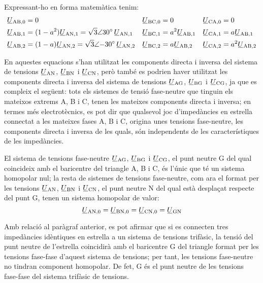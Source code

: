 Expressant-ho en forma matemàtica tenim:
\begin{subequations}
\begin{align}
   \cmplx{U}\ped{AB,0} &= 0 &
   \cmplx{U}\ped{BC,0} &= 0 &
   \cmplx{U}\ped{CA,0} &= 0 \\
   \cmplx{U}\ped{AB,1} &= (1-a^2) \cmplx{U}\ped{AN,1} =
   \complexnum[parse-numbers=false]{\sqrt{3}:30} \,\cmplx{U}\ped{AN,1} &
   \cmplx{U}\ped{BC,1} &= a^2 \cmplx{U}\ped{AB,1} &
   \cmplx{U}\ped{CA,1} &= a \cmplx{U}\ped{AB,1} \label{eq:c_sim_a3} \\
   \cmplx{U}\ped{AB,2} &= (1-a) \cmplx{U}\ped{AN,2}  =
   \complexnum[parse-numbers=false]{\sqrt{3}:-30} \,\cmplx{U}\ped{AN,2} &
   \cmplx{U}\ped{BC,2} &= a \cmplx{U}\ped{AB,2} &
   \cmplx{U}\ped{CA,2} &= a^2 \cmplx{U}\ped{AB,2} \label{eq:c_sim_b3}
\end{align}
\end{subequations}

En aquestes equacions s'han utilitzat les components directa i
inversa del sistema de tensions
$\cmplx{U}\ped{AN}$, $\cmplx{U}\ped{BN}$ i $\cmplx{U}\ped{CN}$,
però també es podrien haver utilitzat les components directa i
inversa del sistema de tensions
$\cmplx{U}\ped{AG}$, $\cmplx{U}\ped{BG}$ i $\cmplx{U}\ped{CG}$,
ja que es compleix el següent: tots els sistemes de tensió
fase-neutre que tinguin els mateixos extrems A, B i
C, tenen les mateixes components directa i inversa; en termes
més electrotècnics, es pot dir que qualsevol joc d'impedàncies en
estrella connectat a les mateixes fases A, B i C,
origina unes tensions fase-neutre, les components directa i inversa
de les quals, són independents de les característiques de les
impedàncies.

El sistema de tensions fase-neutre
$\cmplx{U}\ped{AG}$, $\cmplx{U}\ped{BG}$ i $\cmplx{U}\ped{CG}$,
el punt neutre G del qual coincideix amb el baricentre del
triangle A, B i C, és l'únic que té un sistema homopolar nul; la resta de sistemes de tensions
 fase-neutre, com ara el format per les tensions $\cmplx{U}\ped{AN}$, $\cmplx{U}\ped{BN}$ i $\cmplx{U}\ped{CN}$,
 el punt neutre N del qual està desplaçat respecte del punt G, tenen un sistema
 homopolar de valor:
\begin{equation}
    \cmplx{U}\ped{AN,0} = \cmplx{U}\ped{BN,0} =
    \cmplx{U}\ped{CN,0} = \cmplx{U}\ped{GN}\label{eq:tens-hom}
\end{equation}

Amb relació al paràgraf anterior, es pot afirmar que si es
connecten tres impedàncies idèntiques en estrella a un sistema
de tensions trifàsic, la tensió del punt neutre de l'estrella
coincidirà amb el baricentre G del triangle format per les tensions
fase-fase d'aquest sistema de tensions;  per tant, les tensions fase-neutre no tindran
component homopolar. De fet, G és el punt neutre de les tensions
fase-fase del sistema trifàsic de tensions.


